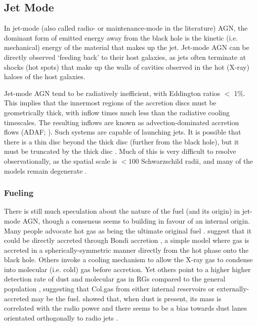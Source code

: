 	\subsection{Jet Mode}
		\label{subsec:Jet}
		In jet-mode (also called radio- or maintenance-mode in the literature) AGN, the dominant form of emitted energy away from the black hole is the kinetic (i.e. mechanical) energy of the material that makes up the jet. Jet-mode AGN can be directly observed `feeding back' to their host galaxies, as jets often terminate at shocks (hot spots) that make up the walls of cavities observed in the hot (X-ray) haloes of the host galaxies.

		Jet-mode AGN tend to be radiatively inefficient, with Eddington ratios $<$ 1\%. This implies that the innermost regions of the accretion discs must be geometrically thick, with inflow times much less than the radiative cooling timescales. The resulting inflows are known as advection-dominated accretion flows (ADAF; \citealt{Narayan1994}). Such systems are capable of launching jets. It is possible that there is a thin disc beyond the thick disc (further from the black hole), but it must be truncated by the thick disc \cite[e.g.][]{Abramowicz2002, Sadler2014}. Much of this is very difficult to resolve observationally, as the spatial scale is $< 100$ Schwarzschild radii, and many of the models remain degenerate \citep[e.g.][]{Quataert1999}. 

		\subsubsection{Fueling}
			\label{subsubsec:JetFueling}
			There is still much speculation about the nature of the fuel (and its origin) in jet-mode AGN, though a consensus seems to building in favour of an internal origin. Many people advocate hot gas as being the ultimate original fuel \citep[e.g.][]{Allen2006}. \citet{Hardcastle2007a} suggest that it could be directly accreted through Bondi accretion \citep{Bondi1952}, a simple model where gas is accreted in a spherically-symmetric manner directly from the hot phase onto the black hole. Others invoke a cooling mechanism to allow the X-ray gas to condense into molecular (i.e. cold) gas before accretion. Yet others point to a higher higher detection rate of dust and molecular gas in RGs compared to the general population \citep[e.g.][]{Lim2000, DeRuiter2002,Lim2003, VerdoesKleijn2005}, suggesting that Col.gas from either internal reservoirs or externally-accreted may be the fuel. \citet{DeRuiter2002} showed that, when dust is present, its mass is correlated with the radio power and there seems to be a bias towards dust lanes orientated orthogonally to radio jets \citep{VerdoesKleijn2005}.

